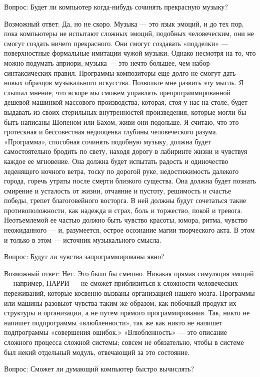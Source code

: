\documentclass[../main.tex]{subfiles}
\begin{document}
Вопрос: Будет ли компьютер когда-нибудь сочинять прекрасную музыку?

Возможный ответ: Да, но не скоро. Музыка --- это язык эмоций, и до тех пор, пока компьютеры не испытают сложных эмоций, подобных человеческим, они не смогут создать ничего прекрасного. Они смогут создавать «подделки» --- поверхностные формальные имитации чужой музыки. Однако несмотря на то, что можно подумать априори, музыка --- это нечто большее, чем набор синтаксических правил. Программы-композиторы еще долго не смогут дать новых образцов музыкального искусства. Позвольте мне развить эту мысль. Я слышал мнение, что вскоре мы сможем управлять препрограммированной дешевой машинкой массового производства, которая, стоя у нас на столе, будет выдавать из своих стерильных внутренностей произведения, которые могли бы быть написаны Шопеном или Бахом, живи они подольше. Я считаю, что это гротескная и бессовестная недооценка глубины человеческого разума. «Программа», способная сочинять подобную музыку, должна будет самостоятельно бродить по свету, находя дорогу в лабиринте жизни и чувствуя каждое ее мгновение. Она должна будет испытать радость и одиночество леденящего ночного ветра, тоску по дорогой руке, недостижимость далекого города, горечь утраты после смерти близкого существа. Она должна будет познать смирение и усталость от жизни, отчаяние и пустоту, решимость и счастье победы, трепет благоговейного восторга. В ней должны будут сочетаться такие противоположности, как надежда и страх, боль и торжество, покой и тревога. Неотъемлемой ее частью должно быть чувство красоты, юмора, ритма, чувство неожиданного --- и, разумеется, острое осознание магии творческого акта. В этом и только в этом --- источник музыкального смысла.

Вопрос: Будут ли чувства запрограммированы явно?

Возможный ответ: Нет. Это было бы смешно. Никакая прямая симуляция эмоций --- например, ПАРРИ --- не сможет приблизиться к сложности человеческих переживаний, которые косвенно вызваны организацией нашего мозга. Программы или машины разовьют чувства таким же образом, как побочный продукт их структуры и организации, а не путем прямого программирования. Так, никто не напишет подпрограммы «влюбленности», так же как никто не напишет подпрограммы «совершения ошибок.» «Влюбленность» --- это описание сложного процесса сложной системы; совсем не обязательно, чтобы в системе был некий отдельный модуль, отвечающий за это состояние.

Вопрос: Сможет ли думающий компьютер быстро вычислять?
\end{document}
